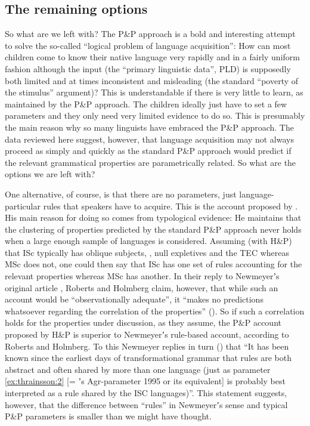 \documentclass[output=paper]{LSP/langsci}
\begin{document}
\subsection{The remaining options}
So what are we left with? The P{\&}P approach is a bold and interesting attempt to solve the so-called “logical problem of language acquisition”: How can most children come to know their native language very rapidly and in a fairly uniform fashion although the input (the “primary linguistic data”, PLD) is supposedly both limited and at times inconsistent and misleading (the standard “poverty of the stimulus” argument)? This is understandable if there is very little to learn, as maintained by the P{\&}P approach. The children ideally just have to set a few parameters and they only need very limited evidence to do so. This is presumably the main reason why so many linguists have embraced the P{\&}P approach. The data reviewed here suggest, however, that language acquisition may not always proceed as simply and quickly as the standard P{\&}P approach would predict if the relevant grammatical properties are parametrically related. So what are the options we are left with?

One alternative, of course, is that there are no parameters, just lan\-guage-par\-tic\-u\-lar  rules that speakers have to acquire. This is the account proposed by \citet{Newmeyer2004,Newmeyer2005,Newmeyer2006}. His main reason for doing so comes from typological evidence: He maintains that the clustering of properties predicted by the standard P{\&}P approach never holds when a large enough sample of languages is considered. Assuming (with H{\&}P) that ISc typically has oblique subjects, , null expletives and the TEC whereas MSc does not, one could then say that ISc has one set of rules accounting for the relevant properties whereas MSc has another. In their reply to Newmeyerʼs original article \citep{Newmeyer2004}, Roberts and Holmberg claim, however, that while such an account would be “observationally adequate”, it “makes no predictions whatsoever regarding the correlation of the properties” (\citeyear[551]{Roberts2005}). So if such a correlation holds for the properties under discussion, as they assume, the P{\&}P account proposed by H{\&}P is superior to Newmeyerʼs rule-based account, according to Roberts and Holmberg. To this Newmeyer replies in turn (\citeyear[7]{Newmeyer2006}) that “It has been known since the earliest days of transformational grammar that rules are both abstract and often shared by more than one language (just as parameter \ref{ex:thrainsson:2} [= \citeauthor{Holmplat1995}ʼs Agr-parameter 1995 or its equivalent] is probably best interpreted as a rule shared by the ISC languages)”. This statement suggests, however, that the difference between “rules” in Newmeyerʼs sense and typical P{\&}P parameters is smaller than we might have thought.
\end{document}
